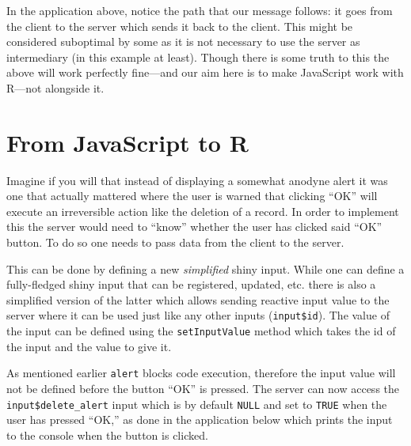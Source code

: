 \documentclass[
]{krantz}
\makeatletter
\newenvironment{Shaded}{\begin{snugshade}}{\end{snugshade}}
\newcommand{\KeywordTok}[1]{\textcolor[rgb]{0.27,0.27,0.27}{\textbf{#1}}}
\newcommand{\NormalTok}[1]{#1}
\newcommand{\OperatorTok}[1]{\textcolor[rgb]{0.43,0.43,0.43}{\textbf{#1}}}
\newcommand{\StringTok}[1]{\textcolor[rgb]{0.5,0.5,0.5}{#1}}
\newenvironment{kframe}{%
\medskip{}
\setlength{\fboxsep}{.8em}
 \def\at@end@of@kframe{}%
 \ifinner\ifhmode%
  \def\at@end@of@kframe{\end{minipage}}%
  \begin{minipage}{\columnwidth}%
 \fi\fi%
 \def\FrameCommand##1{\hskip\@totalleftmargin \hskip-\fboxsep
 \colorbox{shadecolor}{##1}\hskip-\fboxsep
     \hskip-\linewidth \hskip-\@totalleftmargin \hskip\columnwidth}%
 \MakeFramed {\advance\hsize-\width
   \@totalleftmargin\z@ \linewidth\hsize
   \@setminipage}}%
 {\par\unskip\endMakeFramed%
 \at@end@of@kframe}
\renewenvironment{Shaded}{\begin{kframe}}{\end{kframe}}
\makeatother
\begin{document}
In the application above, notice the path that our message follows: it goes from the client to the server which sends it back to the client. This might be considered suboptimal by some as it is not necessary to use the server as intermediary (in this example at least). Though there is some truth to this the above will work perfectly fine---and our aim here is to make JavaScript work with R---not alongside it.

\hypertarget{from-javascript-to-r}{%
\section*{From JavaScript to R}\label{from-javascript-to-r}}


Imagine if you will that instead of displaying a somewhat anodyne alert it was one that actually mattered where the user is warned that clicking ``OK'' will execute an irreversible action like the deletion of a record. In order to implement this the server would need to ``know'' whether the user has clicked said ``OK'' button. To do so one needs to pass data from the client to the server.

This can be done by defining a new \emph{simplified} shiny input. While one can define a fully-fledged shiny input that can be registered, updated, etc. there is also a simplified version of the latter which allows sending reactive input value to the server where it can be used just like any other inputs (\texttt{input\$id}). The value of the input can be defined using the \texttt{setInputValue} method which takes the id of the input and the value to give it.

\begin{Shaded}
\end{Shaded}

As mentioned earlier \texttt{alert} blocks code execution, therefore the input value will not be defined before the button ``OK'' is pressed. The server can now access the \texttt{input\$delete\_alert} input which is by default \texttt{NULL} and set to \texttt{TRUE} when the user has pressed ``OK,'' as done in the application below which prints the input to the console when the button is clicked.
\end{document}
